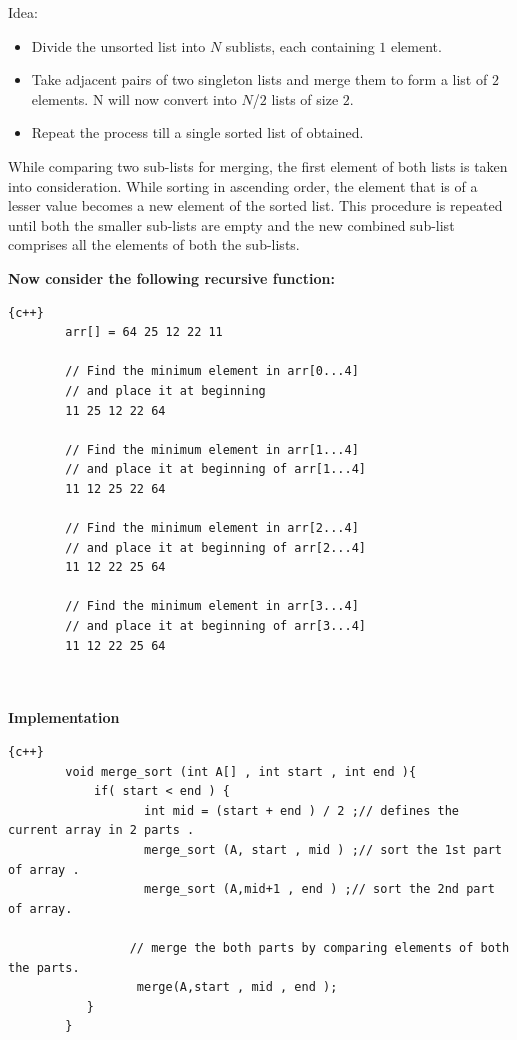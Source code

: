 Idea:
\begin{itemize}
\item Divide the unsorted list into $N$ sublists, each containing  $1$ element.

\item Take adjacent pairs of two singleton lists and merge them to form a list of $2$ elements. N will now convert into $N $/$ 2$ lists of size $2$.

\item Repeat the process till a single sorted list of obtained.

\end{itemize}

\hspace{7mm}While comparing two sub-lists for merging, the first element of both lists is taken into consideration. While sorting in ascending order, the element that is of a lesser value becomes a new element of the sorted list. This procedure is repeated until both the smaller sub-lists are empty and the new combined sub-list comprises all the elements of both the sub-lists.

\textbf{\Large{Now consider the following recursive function:}}
\begin{lstlisting}{c++}
        arr[] = 64 25 12 22 11
        
        // Find the minimum element in arr[0...4]
        // and place it at beginning
        11 25 12 22 64
        
        // Find the minimum element in arr[1...4]
        // and place it at beginning of arr[1...4]
        11 12 25 22 64
        
        // Find the minimum element in arr[2...4]
        // and place it at beginning of arr[2...4]
        11 12 22 25 64
        
        // Find the minimum element in arr[3...4]
        // and place it at beginning of arr[3...4]
        11 12 22 25 64 

\end{lstlisting}
\\
\\
\newline\newline
\textbf{{\Large{Implementation}}}
\begin{lstlisting}{c++}
        void merge_sort (int A[] , int start , int end ){
            if( start < end ) {
                   int mid = (start + end ) / 2 ;// defines the current array in 2 parts .
                   merge_sort (A, start , mid ) ;// sort the 1st part of array .
                   merge_sort (A,mid+1 , end ) ;// sort the 2nd part of array.
        
                 // merge the both parts by comparing elements of both the parts.
                  merge(A,start , mid , end );   
           }                    
        }
\end{lstlisting}

